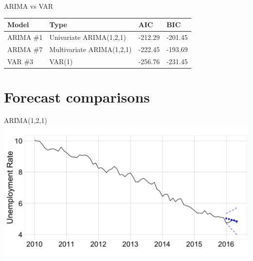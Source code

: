 \documentclass[ignorenonframetext]{beamer}
\begin{document}
  	\begin{frame}{ARIMA vs VAR}
\begin{table}[htb]
\begin{tabular}{llll}
  \hline
Model & Type & AIC & BIC \\ 
  \hline
ARIMA \#1 & Univariate ARIMA(1,2,1) &   -212.29 & -201.45  \\ 
ARIMA \#7 & Multivariate ARIMA(1,2,1)  & -222.45 & -193.69   \\ 
VAR \#3 & VAR(1) & -256.76 & -231.45 \\ 
   \hline
\end{tabular}
\end{table}
  	\end{frame}
 
 
 \section{Forecast comparisons}
 
  	\begin{frame}{ARIMA(1,2,1)}
  		 \includegraphics[width=\linewidth]{images/ARIMApred}
  	\end{frame}
 
\end{document}
